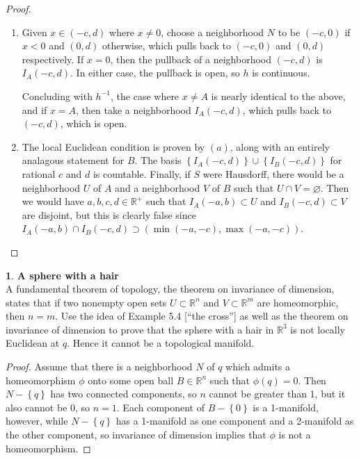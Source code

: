 \documentclass[12pt]{article}
\theoremstyle{definition}
\newtheorem{ex}{}[section]
\begin{document}
\begin{proof}
	\begin{enumerate}[label=(\alph*)]
		\item
		      Given $x \in (-c, d)$ where $x \neq 0$, choose a neighborhood $N$ to be $(-c, 0)$ if $x < 0$ and $(0, d)$ otherwise, which pulls back to $(-c, 0)$ and $(0, d)$ respectively.
		      If $x = 0$, then the pullback of a neighborhood $(-c, d)$ is $I_A(-c, d)$.
		      In either case, the pullback is open, so $h$ is continuous.

		      Concluding with $h^{-1}$, the case where $x \neq A$ is nearly identical to the above, and if $x = A$, then take a neighborhood $I_A(-c, d)$, which pulls back to $(-c, d)$, which is open.
		\item
		      The local Euclidean condition is proven by $(a)$, along with an entirely analagous statement for $B$.
		      The basis $\left\lbrace I_A(-c, d) \right\rbrace \cup \left\lbrace I_B(-c, d) \right\rbrace$ for rational $c$ and $d$ is countable.
		      Finally, if $S$ were Hausdorff, there would be a neighborhood $U$ of $A$ and a neighborhood $V$ of $B$ such that $U \cap V = \varnothing$.
		      Then we would have $a, b, c, d \in \mathbb{R}^+$ such that $I_A(-a, b) \subset U$ and $I_B(-c, d) \subset V$ are disjoint, but this is clearly false since $I_A(-a, b) \cap I_B(-c, d) \supset (\min(-a, -c), \max(-a, -c))$.
	\end{enumerate}
\end{proof}

\begin{ex}
	\textbf{A sphere with a hair} \\
	A fundamental theorem of topology, the theorem on invariance of dimension, states that if two nonempty open sets $U \subset \mathbb{R}^n$ and $V \subset \mathbb{R}^m$ are homeomorphic, then $n = m$.
	Use the idea of Example 5.4 [``the cross''] as well as the theorem on invariance of dimension to prove that the sphere with a hair in $\mathbb{R}^3$ is not locally Euclidean at $q$.
	Hence it cannot be a topological manifold.
\end{ex}
\begin{proof}
	Assume that there is a neighborhood $N$ of $q$ which admits a homeomorphism $\phi$ onto some open ball $B \in \mathbb{R}^n$ such that $\phi(q) = 0$.
	Then $N - \left\lbrace q \right\rbrace$ has two connected components, so $n$ cannot be greater than 1, but it also cannot be 0, so $n=1$.
	Each component of $B - \left\lbrace 0 \right\rbrace$ is a 1-manifold, however, while $N - \left\lbrace q \right\rbrace$ has a 1-manifold as one component and a 2-manifold as the other component, so invariance of dimension implies that $\phi$ is not a homeomorphism.
\end{proof}
\end{document}
